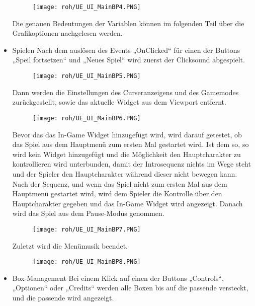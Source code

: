 \begin{itemize}
    \begin{figure}[H]
        \centering
        \texttt{[image: roh/UE\_UI\_MainBP4.PNG]}
        \label{UE:UI_MainBP3_4_2}
    \end{figure}
    Die genauen Bedeutungen der Variablen können im folgenden Teil über die Grafikoptionen nachgelesen werden.
    \item Spielen
    Nach dem auslösen des Events „OnClicked“ für einen der Buttons „Speil fortsetzen“ und „Neues Spiel“ wird zuerst der Clicksound abgespielt.
    \begin{figure}[H]
        \centering
        \texttt{[image: roh/UE\_UI\_MainBP5.PNG]}
        \label{UE:UI_MainBP5}
    \end{figure}
    Dann werden die Einstellungen des Curseranzeigens und des Gamemodes zurückgestellt, sowie das aktuelle Widget aus dem Viewport entfernt.
    \begin{figure}[H]
        \centering
        \texttt{[image: roh/UE\_UI\_MainBP6.PNG]}
        \label{UE:UI_MainBP6}
    \end{figure}
    Bevor das das In-Game Widget hinzugefügt wird, wird darauf getestet, ob das Spiel aus dem Hauptmenü zum ersten Mal gestartet wird. Ist dem so, so wird kein Widget hinzugefügt und die Möglichkeit den Hauptcharakter zu kontrollieren wird unterbunden, damit der Introsequenz nichts im Wege steht und der Spieler den Hauptcharakter während dieser nicht bewegen kann. Nach der Sequenz, und wenn das Spiel nicht zum ersten Mal aus dem Hauptmenü gestartet wird, wird dem Spieler die Kontrolle über den Hauptcharakter gegeben und das In-Game Widget wird angezeigt.
    Danach wird das Spiel aus dem Pause-Modus genommen.
    \begin{figure}[H]
        \centering
        \texttt{[image: roh/UE\_UI\_MainBP7.PNG]}
        \label{UE:UI_MainBP7}
    \end{figure}
    Zuletzt wird die Menümusik beendet.
    \begin{figure}[H]
        \centering
        \texttt{[image: roh/UE\_UI\_MainBP8.PNG]}
        \label{UE:UI_MainBP8}
    \end{figure}
    \item Box-Management
    Bei einem Klick auf einen der Buttons „Controls“, „Optionen“ oder „Credits“ werden alle Boxen bis auf die passende versteckt, und die passende wird angezeigt.
    \begin{figure}[H]
        \centering

\end{figure}
\end{itemize}
